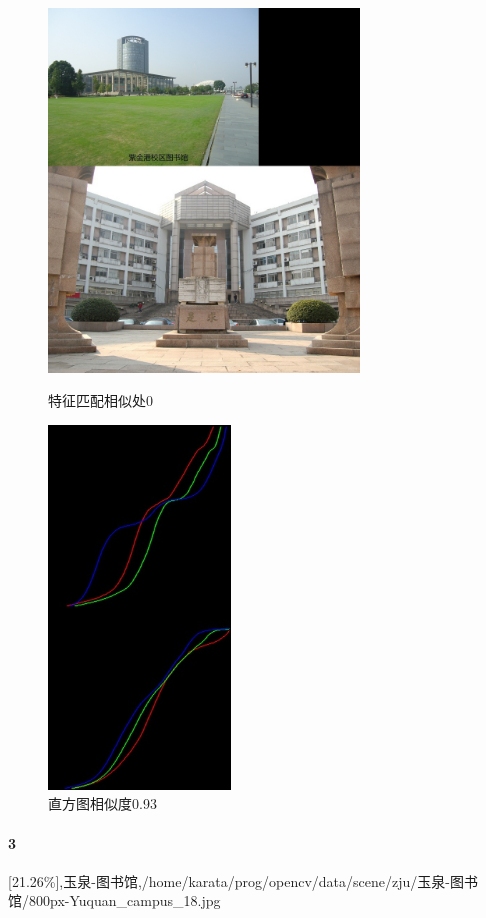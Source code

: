 \begin{figure}[htb]
\begin{minipage}[t]{0.5\linewidth}
\centering
\includegraphics[height=3.8in]{紫金港图书馆.jpg.d/im2sift.jpg}
\caption{特征匹配相似处0}
\label{fig:side:a}
\end{minipage}%
\begin{minipage}[t]{0.5\linewidth}
\centering
\includegraphics[height=3.8in]{紫金港图书馆.jpg.d/im2hist2.jpg}
\caption{直方图相似度0.93}
\label{fig:side:a}
\end{minipage}%
\end{figure}

\paragraph{3}
[21.26\%],玉泉-图书馆,/home/karata/prog/opencv/data/scene/zju/玉泉-图书馆/800px-Yuquan_campus_18.jpg

